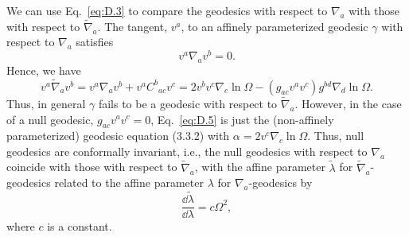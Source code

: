 We can use Eq.~\eqref{eq:D.3} to compare the geodesics with respect to
\(\nabla_a\) with those with respect to \(\widetilde\nabla_a\). The tangent, \(v^a\),
to an affinely parameterized geodesic \(\gamma\) with respect to \(\nabla_a\)
satisfies
\begin{equation}
  v^a\nabla_av^b=0.
  \tag{D.4}\label{eq:D.4}
\end{equation}
Hence, we have
\begin{equation}
  v^a\widetilde\nabla_av^b
  =v^a\nabla_av^b+v^aC^b{}_{ac}v^c
  =2v^bv^c\nabla_c\ln\Omega
  -(g_{ac}v^av^c)g^{bd}\nabla_d\ln\Omega.
  \tag{D.5}\label{eq:D.5}
\end{equation}
Thus, in general \(\gamma\) fails to be a geodesic with respect to
\(\widetilde\nabla_a\). However, in the case of a null geodesic,
\(g_{ac}v^av^c=0\), Eq.~\eqref{eq:D.5} is just the (non-affinely parameterized)
geodesic equation (3.3.2) with \(\alpha=2v^c\nabla_c\ln\Omega\). Thus, null
geodesics are conformally invariant, i.e., the null geodesics with respect to
\(\nabla_a\) coincide with those with respect to \(\widetilde\nabla_a\), with the
affine parameter \(\widetilde\lambda\) for \(\widetilde\nabla_a\)-geodesics related
to the affine parameter \(\lambda\) for \(\nabla_a\)-geodesics by
\begin{equation}
  \frac{\dd\widetilde\lambda}{\dd\lambda}=c\Omega^2,
  \tag{D.6}\label{eq:D.6}
\end{equation}
where \(c\) is a constant.

